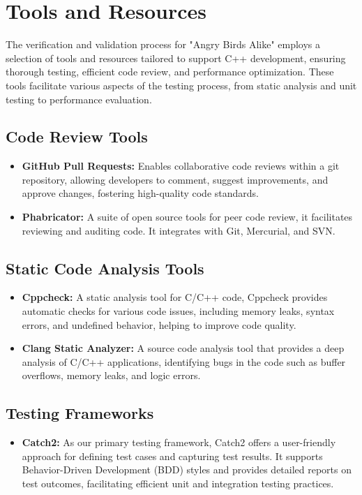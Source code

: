 \documentclass[12pt]{article}
\begin{document}
\section{Tools and Resources}
The verification and validation process for "Angry Birds Alike" employs a selection of tools and resources tailored to support C++ development, ensuring thorough testing, efficient code review, and performance optimization. These tools facilitate various aspects of the testing process, from static analysis and unit testing to performance evaluation.

\subsection{Code Review Tools}
\begin{itemize}
    \item \textbf{GitHub Pull Requests:} Enables collaborative code reviews within a git repository, allowing developers to comment, suggest improvements, and approve changes, fostering high-quality code standards.
    \item \textbf{Phabricator:} A suite of open source tools for peer code review, it facilitates reviewing and auditing code. It integrates with Git, Mercurial, and SVN.
\end{itemize}

\subsection{Static Code Analysis Tools}
\begin{itemize}
    \item \textbf{Cppcheck:} A static analysis tool for C/C++ code, Cppcheck provides automatic checks for various code issues, including memory leaks, syntax errors, and undefined behavior, helping to improve code quality.
    \item \textbf{Clang Static Analyzer:} A source code analysis tool that provides a deep analysis of C/C++ applications, identifying bugs in the code such as buffer overflows, memory leaks, and logic errors.
\end{itemize}

\subsection{Testing Frameworks}
\begin{itemize}
    \item \textbf{Catch2:} As our primary testing framework, Catch2 offers a user-friendly approach for defining test cases and capturing test results. It supports Behavior-Driven Development (BDD) styles and provides detailed reports on test outcomes, facilitating efficient unit and integration testing practices.
\end{itemize}
\end{document}
